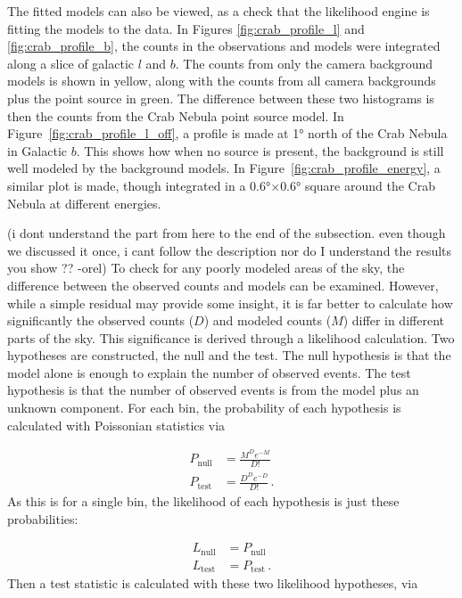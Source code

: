   The fitted models can also be viewed, as a check that the likelihood engine is fitting the models to the data.
  In Figures \ref{fig:crab_profile_l} and \ref{fig:crab_profile_b}, the counts in the observations and models were integrated along a slice of galactic $l$ and $b$.
  The counts from only the camera background models is shown in yellow, along with the counts from all camera backgrounds plus the point source in green.
  The difference between these two histograms is then the counts from the Crab Nebula point source model.
  In Figure~\ref{fig:crab_profile_l_off}, a profile is made at \ang{1} north of the Crab Nebula in Galactic $b$.
  This shows how when no source is present, the background is still well modeled by the background models.
  In Figure~\ref{fig:crab_profile_energy}, a similar plot is made, though integrated in a \ang{0.6}$\times$\ang{0.6} square around the Crab Nebula at different energies.
  
  {\color{red}(i dont understand the part from here to the end of the subsection.  even though we discussed it once, i cant follow the description nor do I understand the results you show ?? -orel)}
  To check for any poorly modeled areas of the sky, the difference between the observed counts and models can be examined.
  However, while a simple residual may provide some insight, it is far better to calculate how significantly the observed counts ($D$) and modeled counts ($M$) differ in different parts of the sky.
  This significance is derived through a likelihood calculation.
  Two hypotheses are constructed, the null and the test.
  The null hypothesis is that the model alone is enough to explain the number of observed events.
  The test hypothesis is that the number of observed events is from the model plus an unknown component.
  For each bin, the probability of each hypothesis is calculated with Poissonian statistics via

  \begin{equation}\label{eqn:sig_hypo}
    \begin{split}
      P_{\textrm{null}} & = \frac{M^{D} e^{-M}}{D!} \\
      P_{\textrm{test}} & = \frac{D^{D} e^{-D}}{D!} \,.
    \end{split}
  \end{equation}
  As this is for a single bin, the likelihood of each hypothesis is just these probabilities:
  
  \begin{equation}
    \begin{split}
      L_{\textrm{null}} & = P_{\textrm{null}} \\
      L_{\textrm{test}} & = P_{\textrm{test}} \,.
    \end{split}
  \end{equation}
  Then a test statistic is calculated with these two likelihood hypotheses, via

